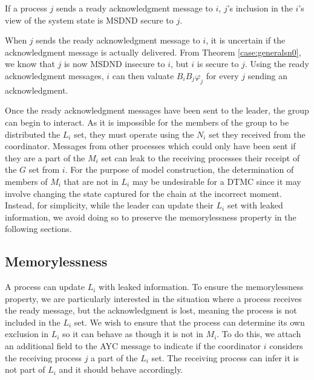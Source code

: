 \begin{thm}
    If a process $j$ sends a ready acknowledgment message to $i$, $j$'s inclusion in the $i$'s view of the system state is MSDND secure to $j$.
\end{thm}
\begin{prooftight}
When $j$ sends the ready acknowledgment message to $i$, it is uncertain if the acknowledgment message is actually delivered.
From Theorem \ref{case:generalsn0}, we know that $j$ is now MSDND insecure to $i$, but $i$ is secure to $j$.
Using the ready acknowledgment messages, $i$ can then valuate $B_i B_j \varphi_j$ for every $j$ sending an acknowledgment.
\end{prooftight}

Once the ready acknowledgment messages have been sent to the leader, the group can begin to interact.
As it is impossible for the members of the group to be distributed the $L_i$ set, they must operate using the $N_i$ set they received from the coordinator.
Messages from other processes which could only have been sent if they are a part of the $M_i$ set can leak to the receiving processes their receipt of the $G$ set from $i$.
For the purpose of model construction, the determination of members of $M_i$ that are not in $L_i$ may be undesirable for a \ac{DTMC} since it may involve changing the state captured for the chain at the incorrect moment.
Instead, for simplicity, while the leader can update their $L_i$ set with leaked information, we avoid doing so to preserve the memorylessness property in the following sections.



\subsection{Memorylessness}

A process can update $L_i$ with leaked information.
To ensure the memorylessness property, we are particularly interested in the situation where a process receives the ready message, but the acknowledgment is lost, meaning the process is not included in the $L_i$ set.
We wish to ensure that the process can determine its own exclusion in $L_i$ so it can behave as though it is not in $M_i$.
To do this, we attach an additional field to the \ac{AYC} message to indicate if the coordinator $i$ considers the receiving process $j$ a part of the $L_i$ set.
The receiving process can infer it is not part of $L_i$ and it should behave accordingly.

